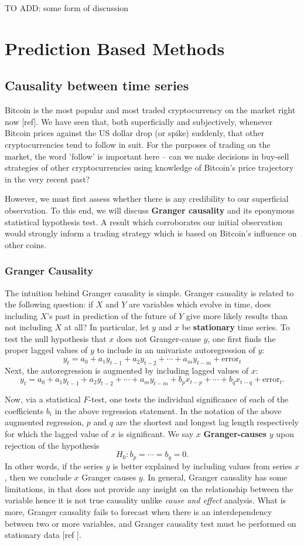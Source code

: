 \documentclass[twoside]{report}
\begin{document}
\begin{spacing}{1}
{\color{red} TO ADD: some form of discussion }


\chapter{Prediction Based Methods}
\section{Causality between time series}
Bitcoin is the most popular and most traded cryptocurrency on the market right now [ref]. We have seen that, both superficially and subjectively, whenever Bitcoin prices against the US dollar drop (or spike) suddenly, that other cryptocurrencies tend to follow in suit. For the purposes of trading on the market, the word 'follow' is important here -- can we make decisions in buy-sell strategies of other cryptocurrencies using knowledge of Bitcoin's price trajectory in the very recent past? 

However, we must first assess whether there is any credibility to our superficial observation. To this end, we will discuss \textbf{Granger causality} and its eponymous statistical hypothesis test. A result which corroborates our initial observation would strongly inform a trading strategy which is based on Bitcoin's influence on other coins. 
\subsection{Granger Causality}
The intuition behind Granger causality is simple. Granger causality is related to the following question: if $X$ and $Y$ are variables which evolve in time, does including $X$'s past in prediction of the future of $Y$ give more likely results than not including $X$ at all? In particular, let $y$ and $x$ be \textbf{stationary} time series. To test the null hypothesis that $x$ does not Granger-cause $y$, one first finds the proper lagged values of $y$ to include in an univariate autoregression of $y$:
\[y_t = a_0 + a_1y_{t-1} + a_2y_{t-2} + \cdots + a_my_{t-m} + \text{error}_t\]
Next, the autoregression is augmented by including lagged values of $x$:
\[y_t = a_0 + a_1y_{t-1} + a_2y_{t-2} + \cdots + a_my_{t-m} + b_px_{t-p} + \cdots + b_qx_{t-q} + \text{error}_t.\]

Now, via a statistical $F$-test, one tests the individual significance of each of the coefficients $b_i$ in the above regression statement. In the notation of the above augmented regression, $p$ and $q$ are the shortest and longest lag length respectively for which the lagged value of $x$ is significant. We say $x$ \textbf{Granger-causes} $y$ upon rejection of the hypothesis \[
H_0: b_p = \cdots = b_q = 0. 
\]
In other words, if the series $y$ is better explained by including values from series $x$, then we conclude $x$ Granger causes $y$. 
In general, Granger causality has some limitations, in that does not provide any insight on the relationship between the variable hence it is not true causality unlike \textit{cause and effect} analysis. What is more, Granger causality fails to forecast when there is an interdependency between two or more variables, and Granger causality test must be performed on stationary data [ref ].


\end{spacing}
\end{document}
